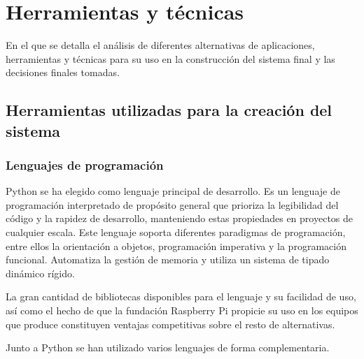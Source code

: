 \chapter{Herramientas y técnicas}

\begin{cabstract}
En el que se detalla el análisis de diferentes alternativas de aplicaciones, herramientas y técnicas para su uso en la construcción del sistema final y las decisiones finales tomadas.
\end{cabstract}

\section{Herramientas utilizadas para la creación del sistema}

\subsection{Lenguajes de programación}

Python se ha elegido como lenguaje principal de desarrollo. Es un lenguaje de programación interpretado de propósito general que prioriza la legibilidad del código y la rapidez de desarrollo, manteniendo estas propiedades en proyectos de cualquier escala. Este lenguaje soporta diferentes paradigmas de programación, entre ellos la orientación a objetos, programación imperativa y la programación funcional. Automatiza la gestión de memoria y utiliza un sistema de tipado dinámico rígido.

La gran cantidad de bibliotecas disponibles para el lenguaje y su facilidad de uso, así como el hecho de que la fundación Raspberry Pi propicie su uso en los equipos que produce constituyen ventajas competitivas sobre el resto de alternativas.

Junto a Python se han utilizado varios lenguajes de forma complementaria.

